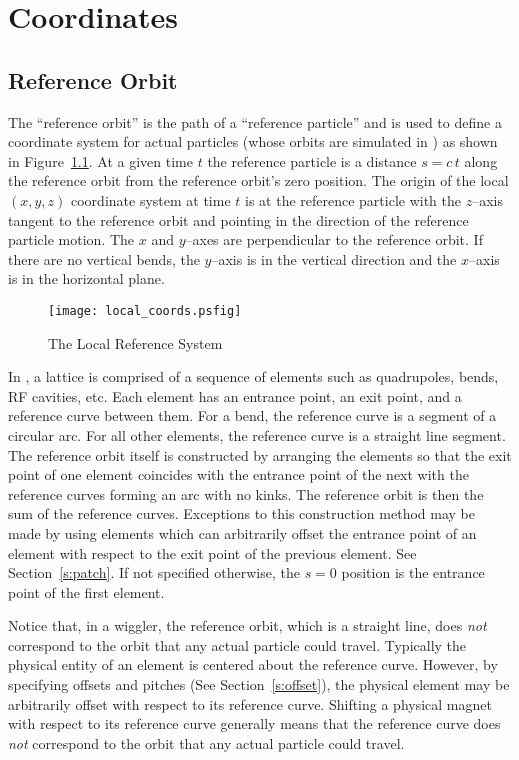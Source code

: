 \chapter{Coordinates}

\section{Reference Orbit}
\label{s:ref}

The ``reference orbit'' is the path of a ``reference particle'' and is
used to define a coordinate system for actual particles (whose orbits
are simulated in \bmad) as shown in Figure~\ref{f:local_coords}. At a
given time $t$ the reference particle is a distance $s = c \, t$ along
the reference orbit from the reference orbit's zero position. The
origin of the local $(x, y, z)$ coordinate system at time $t$ is at the
reference particle with the $z$--axis tangent to the reference
orbit and pointing in the direction of the reference particle
motion. The $x$ and $y$--axes are perpendicular to the reference
orbit. If there are no vertical bends, the $y$--axis is in the
vertical direction and the $x$--axis is in the horizontal plane.

\begin{figure}[tb]
\centering
\texttt{[image: local\_coords.psfig]}
\caption{The Local Reference System}
\label{f:local_coords}
\end{figure}

In \bmad, a lattice is comprised of a sequence of elements such as
quadrupoles, bends, RF cavities, etc. Each element has an entrance
point, an exit point, and a reference curve between them. For a bend,
the reference curve is a segment of a circular arc. For all other
elements, the reference curve is a straight line segment.  The
reference orbit itself is constructed by arranging the elements so that the
exit point of one element coincides with the entrance point of the
next with the reference curves forming an arc with no kinks.
The reference orbit is then the sum of the reference curves. Exceptions
to this construction method may be made
by using  elements which can arbitrarily offset the entrance point
of an element with respect to the exit point of the previous element. 
See Section~\ref{s:patch}. If
not specified otherwise, the $s = 0$ position is the entrance
point of the first element.

Notice that, in a wiggler, the reference orbit, which is a straight
line, does {\em not} correspond to the orbit that any actual particle
could travel. Typically the physical entity of an element is centered
about the reference curve. However, by specifying offsets and pitches
(See Section~\ref{s:offset}), the physical element may be
arbitrarily offset with respect to its reference curve.
Shifting a physical magnet with respect to its
reference curve generally means that the reference curve does {\em
not} correspond to the orbit that any actual particle could travel.

